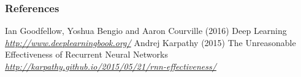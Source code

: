 \begin{vbframe}
\frametitle{References}
\footnotesize{
\begin{thebibliography}{99}
 Ian Goodfellow, Yoshua Bengio and Aaron Courville (2016)
\newblock Deep Learning
\newblock \emph{\url{http://www.deeplearningbook.org/}}
 Andrej Karpathy (2015)
\newblock The Unreasonable Effectiveness of Recurrent Neural Networks
\newblock \emph{\url{http://karpathy.github.io/2015/05/21/rnn-effectiveness/}}
\end{thebibliography}
}
\end{vbframe}

\endlecture
